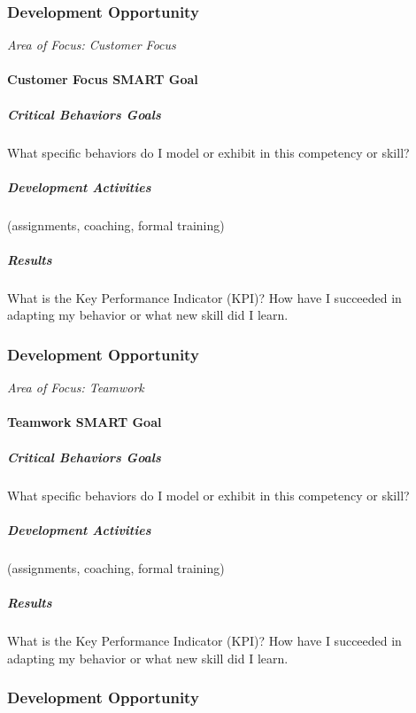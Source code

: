 \subsubsection*{Development Opportunity}

\textit{Area of Focus: Customer Focus}
\paragraph{Customer Focus SMART Goal}
\subparagraph{Critical Behaviors Goals}

What specific behaviors do I model or exhibit in this competency or skill?
\vspace{.3in}

\subparagraph{Development Activities}

(assignments, coaching, formal training)
\vspace{.3in}

\subparagraph{Results}

What is the Key Performance Indicator (KPI)? How have I succeeded in adapting my behavior or what new skill did I learn.
\clearpage



\subsubsection*{Development Opportunity}
\textit{Area of Focus: Teamwork}
\paragraph{Teamwork SMART Goal}
\subparagraph{Critical Behaviors Goals}

What specific behaviors do I model or exhibit in this competency or skill?
\vspace{.3in}

\subparagraph{Development Activities}

(assignments, coaching, formal training)
\vspace{.3in}

\subparagraph{Results}

What is the Key Performance Indicator (KPI)? How have I succeeded in adapting my behavior or what new skill did I learn.
\clearpage




\subsubsection*{Development Opportunity}

